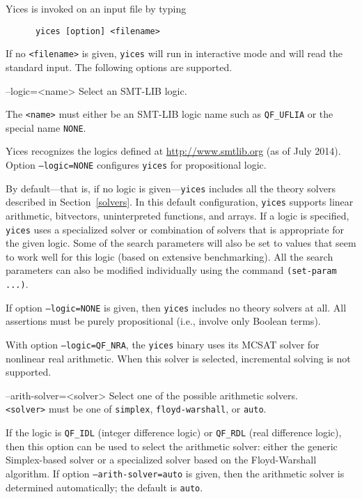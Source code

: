 \documentclass[11pt,twoside,fleqn,openright,titlepage]{cslreport}
\newenvironment{options}{
\begin{list}{}{
\setlength{\labelsep}{1.8ex}
\setlength{\labelwidth}{0pt}
\setlength{\itemindent}{-0.5\leftmargin}
\settowidth{\leftmargin}{\texttt{--}}
\renewcommand{\makelabel}{\optionlabel}}}
{\end{list}}
\newcommand*\optionlabel[1]{\hspace\labelsep\texttt{#1}}
\begin{document}
Yices is invoked on an input file by typing
\begin{verbatim}
      yices [option] <filename>
\end{verbatim}
If no \texttt{<filename>} is given, \texttt{yices} will run in
interactive mode and will read the standard input. The following
options are supported.
\begin{options}
\item[--logic=<name>] Select an SMT-LIB logic.

  The \texttt{<name>} must either be an SMT-LIB logic name such as
  \texttt{QF\_UFLIA} or the special name \texttt{NONE}.

  Yices recognizes the logics defined at \url{http://www.smtlib.org}
  (as of July 2014).  Option \texttt{--logic=NONE} configures
  \texttt{yices} for propositional logic.

  By default---that is, if no logic is given---\texttt{yices} includes
  all the  theory solvers described in  Section~\ref{solvers}. In this
  default  configuration, \texttt{yices}  supports  linear arithmetic,
  bitvectors,  uninterpreted  functions, and  arrays.  If  a logic  is
  specified, \texttt{yices}  uses a specialized  solver or combination
  of  solvers that is  appropriate for  the given  logic. Some  of the
  search parameters will also be set  to values that seem to work well
  for  this logic (based  on extensive  benchmarking). All  the search
  parameters  can  also be  modified  individually  using the  command
  \texttt{(set-param ...)}.

  If  option  \texttt{--logic=NONE}   is  given,  then  \texttt{yices}
  includes no  theory solvers  at all. All  assertions must  be purely
  propositional (i.e., involve only Boolean terms).

  With option \texttt{--logic=QF\_NRA}, the \texttt{yices} binary uses
  its MCSAT solver for nonlinear real arithmetic. When this solver is
  selected, incremental solving is not supported.

\item[--arith-solver=<solver>] Select one of the possible arithmetic solvers.\\[1mm]
  \texttt{<solver>}     must    be     one     of    \texttt{simplex},
  \texttt{floyd-warshall}, or \texttt{auto}.

  If  the  logic is  \texttt{QF\_IDL}  (integer  difference logic)  or
  \texttt{QF\_RDL} (real  difference logic),  then this option  can be
  used   to  select   the  arithmetic   solver:  either   the  generic
  Simplex-based  solver   or  a   specialized  solver  based   on  the
  Floyd-Warshall algorithm.  If option \texttt{--arith-solver=auto} is
  given, then  the arithmetic solver is  determined automatically; the
  default is \texttt{auto}.


\end{options}
\end{document}
